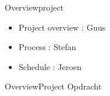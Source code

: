 \begin{frame}{Overview}{project}
    \begin{itemize}
	\item Project overview : Guus
	\item Process : Stefan
	\item Schedule : Jeroen
    \end{itemize}
\end{frame}

\begin{frame}{Overview}{Project Opdracht}



\end{frame}

